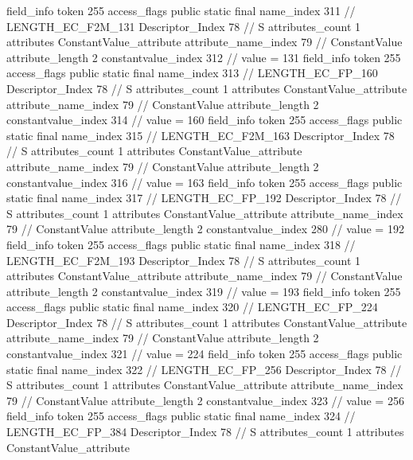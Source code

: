 {{{{{{				}
			}
			field_info {
				token	255
				access_flags	public static final
				name_index	311		// LENGTH_EC_F2M_131
				Descriptor_Index	78		// S
				attributes_count	1
				attributes {
				ConstantValue_attribute {
					attribute_name_index	79		// ConstantValue
					attribute_length	2
					constantvalue_index	312		// value = 131
				}
				}
			}
			field_info {
				token	255
				access_flags	public static final
				name_index	313		// LENGTH_EC_FP_160
				Descriptor_Index	78		// S
				attributes_count	1
				attributes {
				ConstantValue_attribute {
					attribute_name_index	79		// ConstantValue
					attribute_length	2
					constantvalue_index	314		// value = 160
				}
				}
			}
			field_info {
				token	255
				access_flags	public static final
				name_index	315		// LENGTH_EC_F2M_163
				Descriptor_Index	78		// S
				attributes_count	1
				attributes {
				ConstantValue_attribute {
					attribute_name_index	79		// ConstantValue
					attribute_length	2
					constantvalue_index	316		// value = 163
				}
				}
			}
			field_info {
				token	255
				access_flags	public static final
				name_index	317		// LENGTH_EC_FP_192
				Descriptor_Index	78		// S
				attributes_count	1
				attributes {
				ConstantValue_attribute {
					attribute_name_index	79		// ConstantValue
					attribute_length	2
					constantvalue_index	280		// value = 192
				}
				}
			}
			field_info {
				token	255
				access_flags	public static final
				name_index	318		// LENGTH_EC_F2M_193
				Descriptor_Index	78		// S
				attributes_count	1
				attributes {
				ConstantValue_attribute {
					attribute_name_index	79		// ConstantValue
					attribute_length	2
					constantvalue_index	319		// value = 193
				}
				}
			}
			field_info {
				token	255
				access_flags	public static final
				name_index	320		// LENGTH_EC_FP_224
				Descriptor_Index	78		// S
				attributes_count	1
				attributes {
				ConstantValue_attribute {
					attribute_name_index	79		// ConstantValue
					attribute_length	2
					constantvalue_index	321		// value = 224
				}
				}
			}
			field_info {
				token	255
				access_flags	public static final
				name_index	322		// LENGTH_EC_FP_256
				Descriptor_Index	78		// S
				attributes_count	1
				attributes {
				ConstantValue_attribute {
					attribute_name_index	79		// ConstantValue
					attribute_length	2
					constantvalue_index	323		// value = 256
				}
				}
			}
			field_info {
				token	255
				access_flags	public static final
				name_index	324		// LENGTH_EC_FP_384
				Descriptor_Index	78		// S
				attributes_count	1
				attributes {
				ConstantValue_attribute {
}}}}}}}
